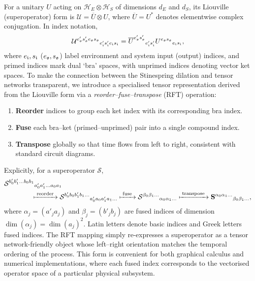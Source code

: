 For a unitary \(U\) acting on \(\mathcal{H}_E \otimes \mathcal{H}_S\) of dimensions \(d_E\) and \(d_S\), its Liouville (superoperator) form is \(\mathcal{U} = \overline{U} \otimes U\), where \(\overline{U} = U^*\) denotes elementwise complex conjugation. In index notation,
\begin{equation}
    \mathcal{U}^{e'_{\mathfrak{o}} s'_{\mathfrak{o}} e_{\mathfrak{o}} s_{\mathfrak{o}}}{}_{e'_{\mathfrak{i}} s'_{\mathfrak{i}} e_{\mathfrak{i}} s_{\mathfrak{i}}} = \overline{U}^{e'_{\mathfrak{o}} s'_{\mathfrak{o}}}{}_{e'_{\mathfrak{i}} s'_{\mathfrak{i}}} U^{e_{\mathfrak{o}} s_{\mathfrak{o}}}{}_{e_{\mathfrak{i}} s_{\mathfrak{i}}},
\end{equation}
where \(e_{\mathfrak{i}}, s_{\mathfrak{i}}\) (\(e_{\mathfrak{o}}, s_{\mathfrak{o}}\)) label environment and system input (output) indices, and primed indices mark dual `bra' spaces, with unprimed indices denoting vector ket spaces. To make the connection between the Stinespring dilation and tensor networks transparent, we introduce a specialised tensor representation derived from the Liouville form via a \emph{reorder--fuse--transpose} (RFT) operation:
\begin{enumerate}
    \item \textbf{Reorder} indices to group each ket index with its corresponding bra index.
    \item \textbf{Fuse} each bra--ket (primed--unprimed) pair into a single compound index.
    \item \textbf{Transpose} globally so that time flows from left to right, consistent with standard circuit diagrams.
\end{enumerate}
Explicitly, for a superoperator \(\mathcal{S}\),
\begin{equation}\label{eq:rft}
    \begin{split}
    &\mathcal{S}^{b'_0 b'_1 \dots b_0 b_1}{}_{a'_0 a'_1 \dots a_0 a_1} \\
    &\qquad\qquad\xmapsto{\;\text{reorder}\;}
    \mathcal{S}^{b'_0 b_0 b'_1 b_1 \dots}{}_{a'_0 a_0 a'_1 a_1 \dots}
    \xmapsto{\;\text{fuse}\;}
    \mathcal{S}^{\beta_0 \beta_1 \dots}{}_{\alpha_0 \alpha_1 \dots}
    \xmapsto{\;\text{transpose}\;}
    \mathbf{S}^{\alpha_0 \alpha_1 \dots}{}_{\beta_0 \beta_1 \dots},
    \end{split}
\end{equation}
where \(\alpha_j = (a'_j a_j)\) and \(\beta_j = (b'_j b_j)\) are fused indices of dimension \(\dim(\alpha_j) = \dim(a_j)^2\). Latin letters denote basic indices and Greek letters fused indices. The RFT mapping simply re-expresses a superoperator as a tensor network-friendly object whose left--right orientation matches the temporal ordering of the process. This form is convenient for both graphical calculus and numerical implementations, where each fused index corresponds to the vectorised operator space of a particular physical subsystem.

